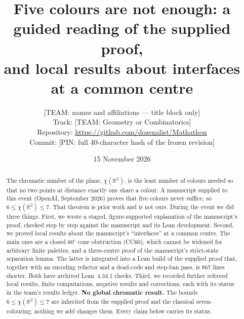 \documentclass[11pt]{article}
\title{Five colours are not enough: a guided reading of the supplied proof,\\
and local results about interfaces at a common centre}
\author{[TEAM: names and affiliations --- title block only]\\
Track: [TEAM: Geometry or Combinatorics]\\
Repository: \url{https://github.com/dozenalist/Mathathon}\\
Commit: [PIN: full 40-character hash of the frozen revision]}
\date{15 November 2026}
\theoremstyle{definition}
\theoremstyle{remark}
\newcommand{\R}{\mathbb{R}}
\begin{document}
\sloppy
\maketitle

\begin{abstract}
The chromatic number of the plane, $\chi(\R^2)$, is the least number of colours needed so that no two points at distance exactly one share a colour. A manuscript supplied to this event (OpenAI, September 2026) proves that five colours never suffice, so $6\le\chi(\R^2)\le7$. That theorem is prior work and is not ours. During the event we did three things. First, we wrote a staged, figure-supported explanation of the manuscript's proof, checked step by step against the manuscript and its Lean development. Second, we proved local results about the manuscript's ``interfaces'' at a common centre. The main ones are a closed $60^\circ$ cone obstruction (CC60), which cannot be widened for arbitrary finite palettes, and a three-centre proof of the manuscript's strict-state separation lemma. The latter is integrated into a Lean build of the supplied proof that, together with an encoding refactor and a dead-code and step-ban pass, is 867 lines shorter. Both have archived Lean~4.34.1 checks. Third, we recorded further refereed local results, finite computations, negative results and corrections, each with its status in the team's results ledger. \textbf{No global chromatic result.} The bounds $6\le\chi(\R^2)\le7$ are inherited from the supplied proof and the classical seven-colouring; nothing we add changes them. Every claim below carries its status.
\end{abstract}
\end{document}
